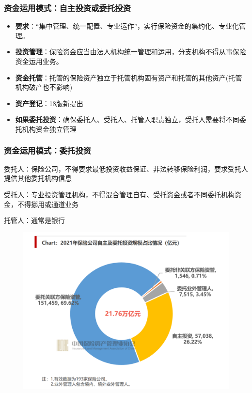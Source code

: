 \documentclass[a4paper,12pt]{ctexbeamer}
\begin{document}
\begin{frame}
    \frametitle{资金运用模式：自主投资或委托投资}
    \begin{itemize}
        \item \textbf{要求}：“集中管理、统一配置、专业运作”，实行保险资金的集约化、专业化管理。
        \item \textbf{投资管理}：保险资金应当由法人机构统一管理和运用，分支机构不得从事保险资金运用业务。
        \item \textbf{资金托管}：托管的保险资产独立于托管机构固有资产和托管的其他资产(托管机构破产也不影响)
        \item \textbf{资产登记}：18版新提出
        \item \textbf{如果委托投资}：确保委托人、受托人、托管人职责独立，受托人需要将不同委托机构资金独立管理
    \end{itemize}

\end{frame}
\begin{frame}
    \frametitle{资金运用模式：委托投资}
    委托人：保险公司，不得要求最低投资收益保证、非法转移保险利润，要求受托人提供其他委托机构信息

    受托人：专业投资管理机构，不得混合管理自有、受托资金或者不同委托机构资金，不得挪用或通道业务

    托管人：通常是银行
    \begin{figure}[H]
        \centering
        \includegraphics[width=0.6\linewidth]{img/trust.jpeg}
    \end{figure}
\end{frame}
\end{document}
